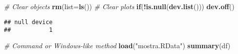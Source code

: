 \documentclass[12pt,]{article}
\newenvironment{Shaded}{\begin{snugshade}}{\end{snugshade}}
\newcommand{\CommentTok}[1]{\textcolor[rgb]{0.56,0.35,0.01}{\textit{#1}}}
\newcommand{\ControlFlowTok}[1]{\textcolor[rgb]{0.13,0.29,0.53}{\textbf{#1}}}
\newcommand{\DataTypeTok}[1]{\textcolor[rgb]{0.13,0.29,0.53}{#1}}
\newcommand{\KeywordTok}[1]{\textcolor[rgb]{0.13,0.29,0.53}{\textbf{#1}}}
\newcommand{\NormalTok}[1]{#1}
\newcommand{\OperatorTok}[1]{\textcolor[rgb]{0.81,0.36,0.00}{\textbf{#1}}}
\newcommand{\StringTok}[1]{\textcolor[rgb]{0.31,0.60,0.02}{#1}}
\begin{document}
\begin{Shaded}
\begin{Highlighting}[]
\CommentTok{# Clear objects}
\KeywordTok{rm}\NormalTok{(}\DataTypeTok{list=}\KeywordTok{ls}\NormalTok{())}
\CommentTok{# Clear plots}
\ControlFlowTok{if}\NormalTok{(}\OperatorTok{!}\KeywordTok{is.null}\NormalTok{(}\KeywordTok{dev.list}\NormalTok{())) }\KeywordTok{dev.off}\NormalTok{()}
\end{Highlighting}
\end{Shaded}

\begin{verbatim}
## null device 
##           1
\end{verbatim}

\begin{Shaded}
\begin{Highlighting}[]
\CommentTok{# Command or Windows-like method}
\KeywordTok{load}\NormalTok{(}\StringTok{"mostra.RData"}\NormalTok{)}
\KeywordTok{summary}\NormalTok{(df)}
\end{Highlighting}
\end{Shaded}
\end{document}
